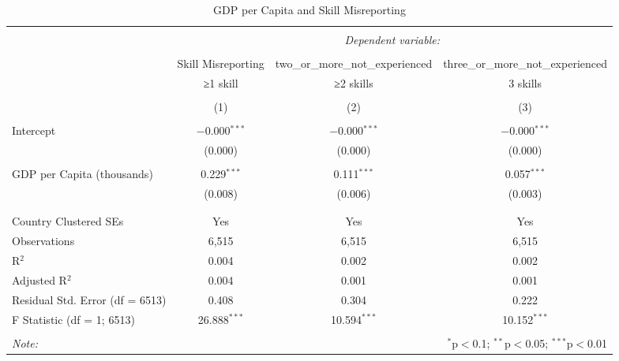 
\begin{table}[!htbp] \centering 
  \caption{GDP per Capita and Skill Misreporting} 
  \label{} 
\begin{tabular}{@{\extracolsep{5pt}}lccc} 
\\[-1.8ex]\hline 
\hline \\[-1.8ex] 
 & \multicolumn{3}{c}{\textit{Dependent variable:}} \\ 
\cline{2-4} 
\\[-1.8ex] & Skill Misreporting & two\_or\_more\_not\_experienced & three\_or\_more\_not\_experienced \\ 
 & ≥1 skill & ≥2 skills & 3 skills \\ 
\\[-1.8ex] & (1) & (2) & (3)\\ 
\hline \\[-1.8ex] 
 Intercept & $-$0.000$^{***}$ & $-$0.000$^{***}$ & $-$0.000$^{***}$ \\ 
  & (0.000) & (0.000) & (0.000) \\ 
  & & & \\ 
 GDP per Capita (thousands) & 0.229$^{***}$ & 0.111$^{***}$ & 0.057$^{***}$ \\ 
  & (0.008) & (0.006) & (0.003) \\ 
  & & & \\ 
\hline \\[-1.8ex] 
Country Clustered SEs & Yes & Yes & Yes \\ 
Observations & 6,515 & 6,515 & 6,515 \\ 
R$^{2}$ & 0.004 & 0.002 & 0.002 \\ 
Adjusted R$^{2}$ & 0.004 & 0.001 & 0.001 \\ 
Residual Std. Error (df = 6513) & 0.408 & 0.304 & 0.222 \\ 
F Statistic (df = 1; 6513) & 26.888$^{***}$ & 10.594$^{***}$ & 10.152$^{***}$ \\ 
\hline 
\hline \\[-1.8ex] 
\textit{Note:}  & \multicolumn{3}{r}{$^{*}$p$<$0.1; $^{**}$p$<$0.05; $^{***}$p$<$0.01} \\ 
\end{tabular} 
\end{table} 
